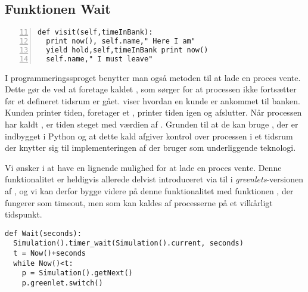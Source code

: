 \subsection{Funktionen Wait}\label{sec:Wait}

\begin{lstlisting}[firstnumber=11 , stepnumber=2, numbers=left,float=hbtp, label=fig:simpy:yield, caption= Et yield i \simpy (Taget fra Bank05.py i eksemplet fra \simpy)] 
def visit(self,timeInBank): 
  print now(), self.name," Here I am" 
  yield hold,self,timeInBank print now()
  self.name," I must leave" 
\end{lstlisting}
I programmeringssproget \simpy benytter man også metoden til at lade en proces vente. Dette gør de ved at
foretage kaldet , som sørger for at processen ikke
fortsætter før et defineret tidsrum er gået.  viser hvordan en kunde er ankommet til banken. Kunden printer tiden, foretager et , printer tiden igen og afslutter.  Når processen har kaldt , er tiden steget med værdien af . Grunden til at de kan bruge , der er indbygget i Python og at dette kald afgiver kontrol over processen i et tidsrum der knytter sig til implementeringen af \simpy der bruger   som underliggende teknologi. 

 Vi ønsker i \pycsp at have en lignende mulighed for at lade en proces vente. Denne funktionalitet er heldigvis allerede delvist introduceret via  til  i \emph{greenlets}-versionen af \pycsp, og vi kan derfor bygge videre på denne funktionalitet med funktionen , der fungerer som timeout, men som kan kaldes af processerne
på et vilkårligt tidspunkt.
\begin{lstlisting}[firstnumber=20,float=hbtp, label=fig:wait, caption=Wait i \code{simulering}-versionen.] 
def Wait(seconds):
  Simulation().timer_wait(Simulation().current, seconds)
  t = Now()+seconds
  while Now()<t:
    p = Simulation().getNext() 
    p.greenlet.switch()
\end{lstlisting}

